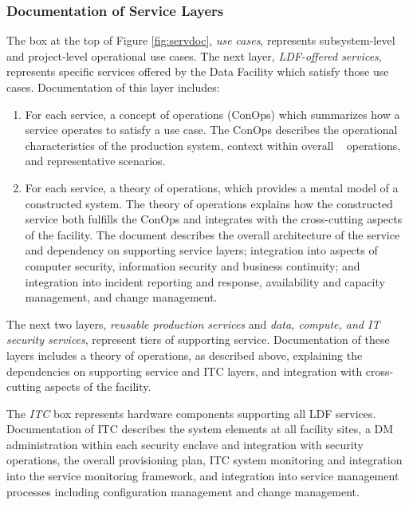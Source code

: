 \subsubsection{Documentation of Service Layers}

The box at the top of Figure \ref{fig:servdoc}, \textit{use cases}, represents subsystem-level and project-level operational use cases. The next layer, \textit{LDF-offered services}, represents specific services offered by the Data Facility which satisfy those use cases. Documentation of this layer includes:

\begin{enumerate}
\item	For each service, a concept of operations (ConOps) which summarizes how a service operates to satisfy a use case. The ConOps describes the operational characteristics of the production system, context within overall \VRO~ operations, and representative scenarios. 
\item	For each service, a theory of operations, which provides a mental model of a constructed system. The theory of operations explains how the constructed service both fulfills the ConOps and integrates with the cross-cutting aspects of the facility. The document describes the overall architecture of the service and dependency on supporting service layers; integration into aspects of computer security, information security and business continuity; and integration into incident reporting and response, availability and capacity management, and change management.
\end{enumerate}

The next two layers, \textit{reusable production services} and \textit{data, compute, and \gls{IT} security services}, represent tiers of supporting service. Documentation of these layers includes a theory of operations, as described above, explaining the dependencies on supporting service and \gls{ITC} layers, and integration with cross-cutting aspects of the facility.

The \textit{ITC} box represents hardware components supporting all \gls{LDF} services. Documentation of \gls{ITC} describes the system elements at all facility sites, a DM administration within each security enclave and integration with security operations, the overall provisioning plan, \gls{ITC} system \gls{monitoring} and integration into the service \gls{monitoring} framework, and integration into service management processes including \gls{configuration} management and change management.

